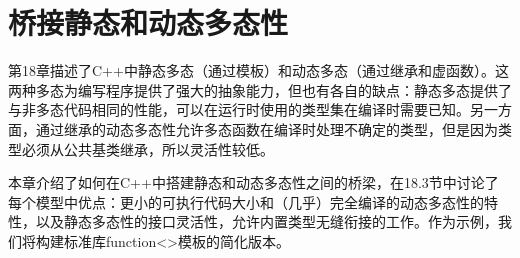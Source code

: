 \chapter{桥接静态和动态多态性}
第18章描述了C++中静态多态（通过模板）和动态多态（通过继承和虚函数）。这两种多态为编写程序提供了强大的抽象能力，但也有各自的缺点：静态多态提供了与非多态代码相同的性能，可以在运行时使用的类型集在编译时需要已知。另一方面，通过继承的动态多态性允许多态函数在编译时处理不确定的类型，但是因为类型必须从公共基类继承，所以灵活性较低。

本章介绍了如何在C++中搭建静态和动态多态性之间的桥梁，在18.3节中讨论了每个模型中优点：更小的可执行代码大小和（几乎）完全编译的动态多态性的特性，以及静态多态性的接口灵活性，允许内置类型无缝衔接的工作。作为示例，我们将构建标准库function<>模板的简化版本。






